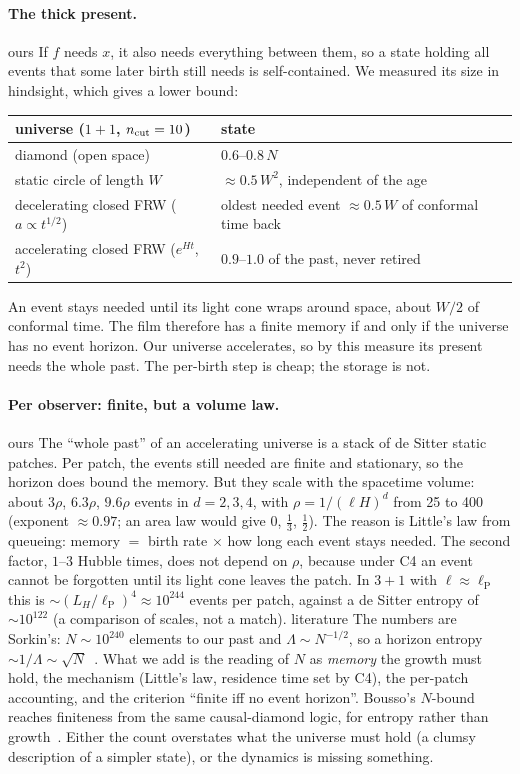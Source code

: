 \documentclass[11pt,a4paper]{article}
\newcommand{\tagbox}[2]{\textsf{\scriptsize\colorbox{#1!12}{\textcolor{#1!70!black}{#2}}}}
\newcommand{\lit}{\tagbox{blue}{literature}}
\newcommand{\ours}{\tagbox{orange}{ours}}
\newcommand{\lP}{\ell_{\mathrm P}}
\begin{document}
\paragraph{The thick present.} \ours{} If $f$ needs $x$, it also needs everything between them, so a state holding all events that some later birth still needs is self-contained. We measured its size in hindsight, which gives a lower bound:
\begin{center}\small
\begin{tabular}{@{}ll@{}}
\toprule
universe ($1+1$, $n_{\rm cut}=10$) & state\\
\midrule
diamond (open space) & $0.6$--$0.8\,N$\\
static circle of length $W$ & $\approx0.5\,W^2$, independent of the age\\
decelerating closed FRW ($a\propto t^{1/2}$) & oldest needed event $\approx0.5\,W$ of conformal time back\\
accelerating closed FRW ($e^{Ht}$, $t^2$) & $0.9$--$1.0$ of the past, never retired\\
\bottomrule
\end{tabular}
\end{center}
An event stays needed until its light cone wraps around space, about $W/2$ of conformal time. The film therefore has a finite memory if and only if the universe has no event horizon. Our universe accelerates, so by this measure its present needs the whole past. The per-birth step is cheap; the storage is not.

\paragraph{Per observer: finite, but a volume law.} \ours{} The ``whole past'' of an accelerating universe is a stack of de Sitter static patches. Per patch, the events still needed are finite and stationary, so the horizon does bound the memory. But they scale with the spacetime volume: about $3\rho$, $6.3\rho$, $9.6\rho$ events in $d=2,3,4$, with $\rho=1/(\ell H)^d$ from 25 to 400 (exponent $\approx0.97$; an area law would give $0$, $\tfrac13$, $\tfrac12$). The reason is Little's law from queueing: memory $=$ birth rate $\times$ how long each event stays needed. The second factor, $1$--$3$ Hubble times, does not depend on $\rho$, because under C4 an event cannot be forgotten until its light cone leaves the patch. In $3+1$ with $\ell\approx\lP$ this is $\sim(L_H/\lP)^4\approx10^{244}$ events per patch, against a de Sitter entropy of $\sim10^{122}$ (a comparison of scales, not a match). \lit{} The numbers are Sorkin's: $N\sim10^{240}$ elements to our past and $\Lambda\sim N^{-1/2}$, so a horizon entropy $\sim1/\Lambda\sim\sqrt N$~\cite{Sorkin07L}. What we add is the reading of $N$ as \emph{memory} the growth must hold, the mechanism (Little's law, residence time set by C4), the per-patch accounting, and the criterion ``finite iff no event horizon''. Bousso's $N$-bound reaches finiteness from the same causal-diamond logic, for entropy rather than growth~\cite{Bousso00}. Either the count overstates what the universe must hold (a clumsy description of a simpler state), or the dynamics is missing something.
\end{document}
